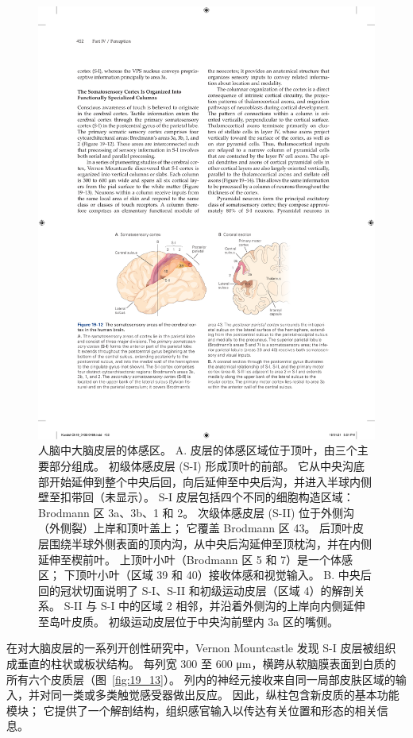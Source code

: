 \begin{figure}[htbp]
	\centering
	\includegraphics[width=1.0\linewidth]{chap19/fig_19_12}
	\caption{人脑中大脑皮层的体感区。
		A. 皮层的体感区域位于顶叶，由三个主要部分组成。
		初级体感皮层 (S-I) 形成顶叶的前部。
		它从中央沟底部开始延伸到整个中央后回，向后延伸至中央后沟，并进入半球内侧壁至扣带回（未显示）。
		S-I 皮层包括四个不同的细胞构造区域：Brodmann 区 3a、3b、1 和 2。
		次级体感皮层 (S-II) 位于外侧沟（外侧裂）上岸和顶叶盖上；
		它覆盖 Brodmann 区 43。
		后顶叶皮层围绕半球外侧表面的顶内沟，从中央后沟延伸至顶枕沟，并在内侧延伸至楔前叶。
		上顶叶小叶（Brodmann 区 5 和 7）是一个体感区；
		下顶叶小叶（区域 39 和 40）接收体感和视觉输入。
		B. 中央后回的冠状切面说明了 S-I、S-II 和初级运动皮层（区域 4）的解剖关系。 
		S-II 与 S-I 中的区域 2 相邻，并沿着外侧沟的上岸向内侧延伸至岛叶皮质。
		初级运动皮层位于中央沟前壁内 3a 区的嘴侧。}
	\label{fig:19_12}
\end{figure}


在对大脑皮层的一系列开创性研究中，Vernon Mountcastle 发现 S-I 皮层被组织成垂直的柱状或板状结构。
每列宽 300 至 600 μm，横跨从软脑膜表面到白质的所有六个皮质层（图~\ref{fig:19_13}）。
列内的神经元接收来自同一局部皮肤区域的输入，并对同一类或多类触觉感受器做出反应。
因此，纵柱包含新皮质的基本功能模块；
它提供了一个解剖结构，组织感官输入以传达有关位置和形态的相关信息。



